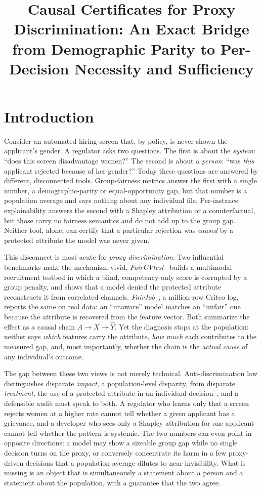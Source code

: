 \documentclass[sn-mathphys-num]{sn-jnl}
\title{Causal Certificates for Proxy Discrimination: An Exact Bridge from Demographic Parity to Per-Decision Necessity and Sufficiency}
\author*[1]{\fnm{Le Vo Minh} \sur{Thu}}\email{lvmthu@hcmus.edu.vn}
\author[1]{\fnm{Le Hoai} \sur{Bac}}
\author[1]{\fnm{Tran Thai} \sur{Son}}
\affil[1]{\orgdiv{Faculty of Information Technology}, \orgname{University of Science, Vietnam National University Ho Chi Minh City (HCMUS, VNU-HCM)}, \orgaddress{\city{Ho Chi Minh City}, \country{Vietnam}}}
\begin{document}
\maketitle

\section{Introduction}
\label{sec:intro}

Consider an automated hiring screen that, by policy, is never shown the
applicant's gender. A regulator asks two questions. The first is about the
\emph{system}: ``does this screen disadvantage women?'' The second is about a
\emph{person}: ``was \emph{this} applicant rejected because of her gender?'' Today
these questions are answered by different, disconnected tools. Group-fairness
metrics answer the first with a single number, a demographic-parity or
equal-opportunity gap, but that number is a population average and says nothing
about any individual file. Per-instance explainability answers the second with a
Shapley attribution or a counterfactual, but those carry no fairness semantics
and do not add up to the group gap. Neither tool, alone, can certify that a
particular rejection was \emph{caused} by a protected attribute the model was
never given.

This disconnect is most acute for \emph{proxy discrimination}. Two influential
benchmarks make the mechanism vivid. \emph{FairCVtest}~\cite{pena2020faircv,
pena2023human} builds a multimodal recruitment testbed in which a blind,
competency-only score is corrupted by a group penalty, and shows that a model
denied the protected attribute reconstructs it from correlated channels.
\emph{FairJob}~\cite{vladimirova2024fairjob}, a million-row Criteo log, reports
the same on real data: an ``unaware'' model matches an ``unfair'' one because the
attribute is recovered from the feature vector. Both summarize the effect as a
causal chain $A\!\to\!X\!\to\!\hat Y$. Yet the diagnosis stops at the population:
neither says \emph{which} features carry the attribute, \emph{how much} each
contributes to the measured gap, and, most importantly, whether the chain is the
\emph{actual cause} of any individual's outcome.

The gap between these two views is not merely technical. Anti-discrimination law
distinguishes disparate \emph{impact}, a population-level disparity, from disparate
\emph{treatment}, the use of a protected attribute in an individual
decision~\cite{barocas2016disparate}, and a defensible audit must speak to both.
A regulator who learns only that a screen rejects women at a higher rate cannot
tell whether a given applicant has a grievance, and a developer who sees only a
Shapley attribution for one applicant cannot tell whether the pattern is systemic.
The two numbers can even point in opposite directions: a model may show a sizeable
group gap while no single decision turns on the proxy, or conversely concentrate
its harm in a few proxy-driven decisions that a population average dilutes to
near-invisibility. What is missing is an object that is simultaneously a statement
about a person and a statement about the population, with a guarantee that the two
agree.
\end{document}
